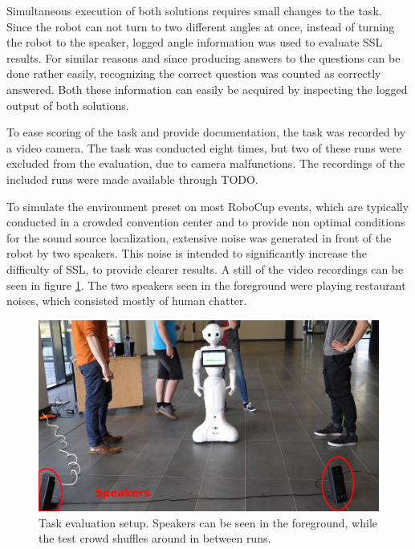 Simultaneous execution of both solutions requires small changes to the task.
Since the robot can not turn to two different angles at once, instead of turning the robot to the speaker, logged angle information was used to evaluate SSL results.
For similar reasons and since producing answers to the questions can be done rather easily, recognizing the correct question was counted as correctly answered.
Both these information can easily be acquired by inspecting the logged output of both solutions.

To ease scoring of the task and provide documentation, the task was recorded by a video camera.
The task was conducted eight times, but two of these runs were excluded from the evaluation, due to camera malfunctions.
The recordings of the included runs were made available through TODO.

To simulate the environment preset on most RoboCup events, which are typically conducted in a crowded convention center and to provide non optimal conditions for the sound source localization, extensive noise was generated in front of the robot by two speakers.
This noise is intended to significantly increase the difficulty of SSL, to provide clearer results.
A still of the video recordings can be seen in figure \ref{pic:eval_task_setup_pepper}.
The two speakers seen in the foreground were playing restaurant noises, which consisted mostly of human chatter.

\begin{figure}[]
	\centering
	\includegraphics[width=\textwidth]{bilder/eval/pepper_task_setup_small.jpg}
	\caption{Task evaluation setup. 
		Speakers can be seen in the foreground, while the test crowd shuffles around in between runs.}
	\label{pic:eval_task_setup_pepper}
\end{figure}

